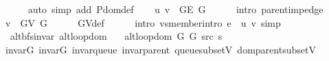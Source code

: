 \begin{isabellebody}
\ \ \ \ \isamarkupfalse%
\ {\isacharparenleft}{\kern0pt}auto\ simp\ add{\isacharcolon}{\kern0pt}\ P{\isachardot}{\kern0pt}dom{\isacharunderscore}{\kern0pt}def{\isacharparenright}{\kern0pt}\isanewline
\ \ \isamarkupfalse%
\ {\isachardoublequoteopen}{\isacharbraceleft}{\kern0pt}u{\isacharcomma}{\kern0pt}\ v{\isacharbraceright}{\kern0pt}\ {\isasymin}\ G{\isachardot}{\kern0pt}E\ G{\isachardoublequoteclose}\isanewline
\ \ \ \ \isamarkupfalse%
\ {\isacharparenleft}{\kern0pt}intro\ parent{\isacharunderscore}{\kern0pt}imp{\isacharunderscore}{\kern0pt}edge{\isacharparenright}{\kern0pt}\isanewline
\ \ \isamarkupfalse%
\ {\isachardoublequoteopen}v\ {\isasymin}\ G{\isachardot}{\kern0pt}V\ G{\isachardoublequoteclose}\isanewline
\ \ \ \ \isamarkupfalse%
\ G{\isachardot}{\kern0pt}V{\isacharunderscore}{\kern0pt}def\isanewline
\ \ \ \ \isamarkupfalse%
\ {\isacharparenleft}{\kern0pt}intro\ vs{\isacharunderscore}{\kern0pt}member{\isacharunderscore}{\kern0pt}intro{\isacharbrackleft}{\kern0pt}\ {\isacharquery}{\kern0pt}e\ {\isacharequal}{\kern0pt}\ {\isachardoublequoteopen}{\isacharbraceleft}{\kern0pt}u{\isacharcomma}{\kern0pt}\ v{\isacharbraceright}{\kern0pt}{\isachardoublequoteclose}{\isacharbrackright}{\kern0pt}{\isacharparenright}{\kern0pt}\ simp\isanewline
{}\isamarkupfalse%
%
\endisatagproof
{\isafoldproof}%
%
\isadelimproof
\isanewline
%
\endisadelimproof
\isanewline
{}\isamarkupfalse%
\ {\isacharparenleft}{\kern0pt}\ alt{\isacharunderscore}{\kern0pt}bfs{\isacharunderscore}{\kern0pt}invar{\isacharparenright}{\kern0pt}\ alt{\isacharunderscore}{\kern0pt}loop{\isacharunderscore}{\kern0pt}dom{\isacharcolon}{\kern0pt}\isanewline
\ \ \ {\isachardoublequoteopen}alt{\isacharunderscore}{\kern0pt}loop{\isacharunderscore}{\kern0pt}dom\ {\isacharparenleft}{\kern0pt}G{}{\isacharcomma}{\kern0pt}\ G{}{\isacharcomma}{\kern0pt}\ src{\isacharcomma}{\kern0pt}\ s{\isacharparenright}{\kern0pt}{\isachardoublequoteclose}\isanewline
%
\isadelimproof
\ \ %
\endisadelimproof
%
\isatagproof
{}\isamarkupfalse%
\ invar{\isacharunderscore}{\kern0pt}G{}\ invar{\isacharunderscore}{\kern0pt}G{}\ invar{\isacharunderscore}{\kern0pt}queue\ invar{\isacharunderscore}{\kern0pt}parent\ queue{\isacharunderscore}{\kern0pt}subset{\isacharunderscore}{\kern0pt}V\ dom{\isacharunderscore}{\kern0pt}parent{\isacharunderscore}{\kern0pt}subset{\isacharunderscore}{\kern0pt}V\isanewline

\end{isabellebody}
